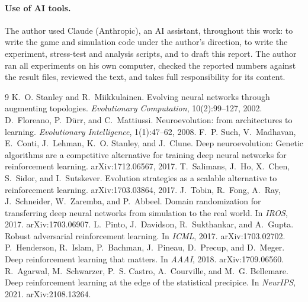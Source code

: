 \documentclass[11pt,a4paper]{article}
\begin{document}
\paragraph{Use of AI tools.} The author used Claude (Anthropic), an AI assistant, throughout this work: to write the game and simulation code under the author's direction, to write the experiment, stress-test and analysis scripts, and to draft this report. The author ran all experiments on his own computer, checked the reported numbers against the result files, reviewed the text, and takes full responsibility for its content.

\begin{thebibliography}{9}\small
{} K.~O. Stanley and R.~Miikkulainen. Evolving neural networks through augmenting topologies. \emph{Evolutionary Computation}, 10(2):99--127, 2002.
 D.~Floreano, P.~D\"urr, and C.~Mattiussi. Neuroevolution: from architectures to learning. \emph{Evolutionary Intelligence}, 1(1):47--62, 2008.
 F.~P. Such, V.~Madhavan, E.~Conti, J.~Lehman, K.~O. Stanley, and J.~Clune. Deep neuroevolution: Genetic algorithms are a competitive alternative for training deep neural networks for reinforcement learning. arXiv:1712.06567, 2017.
 T.~Salimans, J.~Ho, X.~Chen, S.~Sidor, and I.~Sutskever. Evolution strategies as a scalable alternative to reinforcement learning. arXiv:1703.03864, 2017.
 J.~Tobin, R.~Fong, A.~Ray, J.~Schneider, W.~Zaremba, and P.~Abbeel. Domain randomization for transferring deep neural networks from simulation to the real world. In \emph{IROS}, 2017. arXiv:1703.06907.
 L.~Pinto, J.~Davidson, R.~Sukthankar, and A.~Gupta. Robust adversarial reinforcement learning. In \emph{ICML}, 2017. arXiv:1703.02702.
 P.~Henderson, R.~Islam, P.~Bachman, J.~Pineau, D.~Precup, and D.~Meger. Deep reinforcement learning that matters. In \emph{AAAI}, 2018. arXiv:1709.06560.
 R.~Agarwal, M.~Schwarzer, P.~S. Castro, A.~Courville, and M.~G. Bellemare. Deep reinforcement learning at the edge of the statistical precipice. In \emph{NeurIPS}, 2021. arXiv:2108.13264.
\end{thebibliography}
\end{document}
